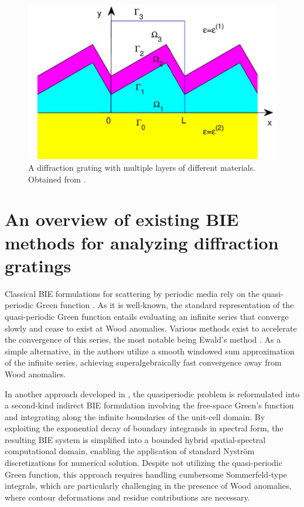 \documentclass[reprint,amsmath,amssymb,
 aps]{revtex4-2}
\begin{document}
\begin{figure}[h!]
\includegraphics[width=0.6\columnwidth]{figures/diff_grating.png}
\caption{A diffraction grating with multiple layers of different materials. Obtained from \cite{wu2011boundary}.}
\label{fig:diff_grat}
\end{figure}


\section{An overview of existing BIE methods for analyzing diffraction gratings}

Classical BIE formulations for scattering by periodic media rely on the quasi-periodic Green function \cite{linton1998green}. As it is well-known, the standard representation of the quasi-periodic Green function entails evaluating an infinite series that converge slowly and cease to exist at Wood anomalies. Various methods exist to accelerate the convergence of this series, the most notable being Ewald's method \cite{linton1998green}. As a simple alternative, in \cite{monro2008super,bruno2016superalgebraically} the authors utilize a smooth windowed sum approximation of the infinite series, achieving superalgebraically fast convergence away from Wood anomalies.

In another approach developed in \cite{barnett2011new,gillman2013fast}, the quasiperiodic problem is reformulated into a second-kind indirect BIE formulation involving the free-space Green's function and integrating along the infinite boundaries of the unit-cell domain. By exploiting the exponential decay of boundary integrands in spectral form, the resulting BIE system is simplified into a bounded hybrid spatial-spectral computational domain, enabling the application of standard Nyström discretizations for numerical solution. Despite not utilizing the quasi-periodic Green function, this approach requires handling cumbersome Sommerfeld-type integrals, which are particularly challenging in the presence of Wood anomalies, where contour deformations and residue contributions are necessary.
\end{document}
